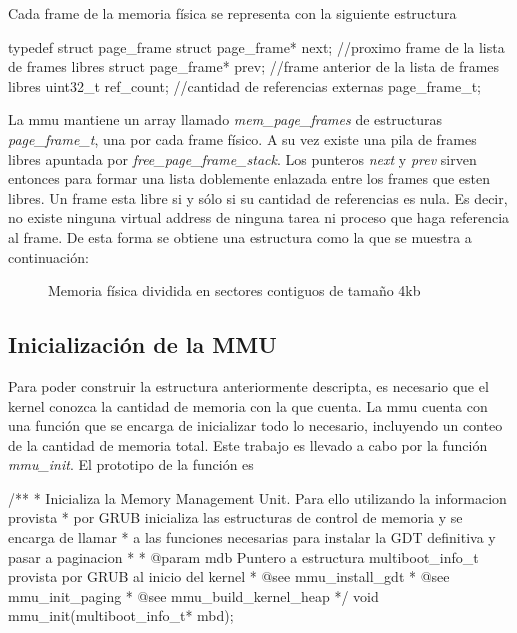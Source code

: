 Cada frame de la memoria física se representa con la siguiente estructura

\begin{verbatimtab}
typedef struct page_frame
{
   struct page_frame* next; //proximo frame de la lista de frames libres
   struct page_frame* prev; //frame anterior de la lista de frames libres
   uint32_t ref_count;  //cantidad de referencias externas
} page_frame_t;
\end{verbatimtab}

La mmu mantiene un array llamado \textit{mem\_page\_frames} de estructuras \textit{page\_frame\_t}, una por cada frame físico. A su vez existe una pila de frames libres apuntada por 
\textit{free\_page\_frame\_stack}. Los punteros \textit{next} y \textit{prev} sirven entonces para formar una lista doblemente enlazada entre los frames que esten libres. Un frame esta libre 
si y sólo si su cantidad de referencias es nula. Es decir, no existe ninguna virtual address de ninguna tarea ni proceso que haga referencia al frame. De esta forma se obtiene una estructura 
como la que se muestra a continuación:

\begin{figure}[H]
\centering
{}
\caption{Memoria física dividida en sectores contiguos de tamaño 4kb}
\end{figure}

\subsection{Inicialización de la MMU}
Para poder construir la estructura anteriormente descripta, es necesario que el kernel conozca la cantidad de memoria con la que cuenta. La mmu cuenta con una función que se encarga de inicializar 
todo lo necesario, incluyendo un conteo de la cantidad de memoria total. Este trabajo es llevado a cabo por la función \textit{mmu\_init}. El prototipo de la función es 

\begin{verbatimtab}
 /**
 * Inicializa la Memory Management Unit. Para ello utilizando la informacion provista 
 * por GRUB inicializa las estructuras de control de memoria y se encarga de llamar 
 * a las funciones necesarias para instalar la GDT definitiva y pasar a paginacion
 *
 * @param mdb Puntero a estructura multiboot_info_t provista por GRUB al inicio del kernel
 * @see mmu_install_gdt
 * @see mmu_init_paging
 * @see mmu_build_kernel_heap
 */
void mmu_init(multiboot_info_t* mbd);
\end{verbatimtab}

